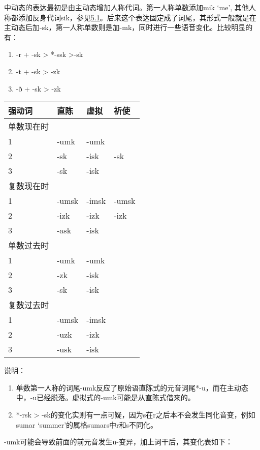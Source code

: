 中动态的表达最初是由主动态增加人称代词。第一人称单数添加mik `me',
其他人称都添加反身代词sik，参见\hyperref[ux4ebaux79f0ux4ee3ux8bcd]{5.1}。后来这个表达固定成了词尾，其形式一般就是在主动态后加-sk，第一人称单数则是加-mk，同时进行一些语音变化。比较明显的有：

\begin{enumerate}
\def\labelenumi{\arabic{enumi})}
\item
  -r + -sk \textgreater{} *-ssk \textgreater-sk
\item
  -t + -sk \textgreater{} -zk
\item
  -ð + -sk \textgreater{} -zk
\end{enumerate}

\begin{longtable}{llll}
\toprule
强动词 & 直陈 & 虚拟 & 祈使 \\
\midrule
\endhead
\bottomrule
\endfoot
单数现在时 & & & \\
1 & -umk & -umk & \\
2 & -sk & -isk & -sk \\
3 & -sk & -isk & \\
复数现在时 & & & \\
1 & -umsk & -imsk & -umsk \\
2 & -izk & -izk & -izk \\
3 & -ask & -isk & \\
单数过去时 & & & \\
1 & -umk & -umk & \\
2 & -zk & -isk & \\
3 & -sk & -isk & \\
复数过去时 & & & \\
1 & -umsk & -imsk & \\
2 & -uzk & -izk & \\
3 & -usk & -isk & \\
\end{longtable}

说明：

\begin{enumerate}
\def\labelenumi{\arabic{enumi})}
\item
  单数第一人称的词尾-umk反应了原始语直陈式的元音词尾*-u，而在主动态中，-u已经脱落。虚拟式的-umk可能是从直陈式借来的。
\item
  *-rsk \textgreater{}
  -sk的变化实则有一点可疑，因为s在r之后本不会发生同化音变，例如sumar
  `summer'的属格sumars中r和s不同化。
\end{enumerate}

-umk可能会导致前面的前元音发生u-变异，加上词干后，其变化表如下：

